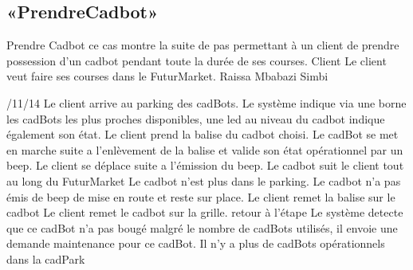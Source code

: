 \subsection{«PrendreCadbot»}
\startCU
\nom Prendre Cadbot
\but ce cas montre la suite de pas permettant à un client de prendre possession d'un cadbot pendant toute la durée de ses courses.
\acteur Client
\precondition Le client veut faire ses courses dans le FuturMarket.
\auteur Raissa Mbabazi Simbi
\date 7/11/14
\nominal %
\startnominal
\etape[PC:SA1] Le client arrive au parking des cadBots.
\etape[PC:RETOUR] Le système indique via une borne les cadBots les plus proches disponibles, une led au niveau du cadbot indique également son état.
\etape[PC:SE1] Le client prend la balise du cadbot choisi.
\etape Le cadBot se met en marche suite a l'enlèvement de la balise et valide son état opérationnel par un beep.
\etape Le client se déplace suite a l'émission du beep.
\etape Le cadbot suit le client tout au long du FuturMarket
\stopnominal
\postcondition Le cadbot n'est plus dans le parking.
\alternatifs
\startalternatif[PC:SE1] %
\etape Le cadbot n'a pas émis de beep de mise en route et reste sur place.
\etape Le client remet la balise sur le cadbot
\etape Le client remet le cadbot sur la grille.
\etape retour à l'étape \in[PC:RETOUR]
\stopcondition
\postcondition Le système detecte que ce cadBot n'a pas bougé malgré le nombre de cadBots utilisés, il envoie une demande maintenance pour ce cadBot.
\stopalternatif
\exception
Il n'y a plus de cadBots opérationnels dans la cadPark
\stopCU
